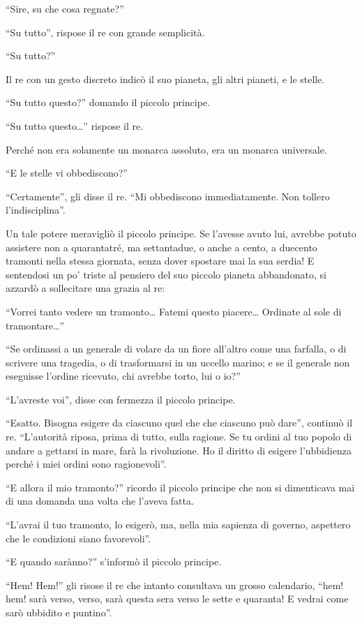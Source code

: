 \documentclass[11pt]{scrbook}
\begin{document}
``Sire, su che cosa regnate?''

``Su tutto'', rispose il re con grande semplicità.

``Su tutto?''

Il re con un gesto discreto indicò il suo pianeta, gli altri pianeti, e le stelle.

``Su tutto questo?'' domando il piccolo principe.

``Su tutto questo\ldots{}'' rispose il re.

Perché non era solamente un monarca assoluto, era un monarca universale.

``E le stelle vi obbediscono?''

``Certamente'', gli disse il re. ``Mi obbediscono immediatamente. Non tollero l'indisciplina''.

Un tale potere meravigliò il piccolo principe. Se l'avesse avuto lui, avrebbe potuto assistere non a quarantatré, ma settantadue, o anche a cento, a duecento tramonti nella stessa giornata, senza dover spostare mai la sua serdia! E sentendosi un po' triste al pensiero del suo piccolo pianeta abbandonato, si azzardò a sollecitare una grazia al re:

``Vorrei tanto vedere un tramonto\ldots{} Fatemi questo piacere\ldots{} Ordinate al sole di tramontare\ldots{}''

``Se ordinassi a un generale di volare da un fiore all'altro come una farfalla, o di scrivere una tragedia, o di trasformarsi in un uccello marino; e se il generale non eseguisse l'ordine ricevuto, chi avrebbe torto, lui o io?''

``L'avreste voi'', disse con fermezza il piccolo principe.

``Esatto. Bisogna esigere da ciascuno quel che che ciascuno può dare'', continuò il re. ``L'autorità riposa, prima di tutto, sulla ragione. Se tu ordini al tuo popolo di andare a gettarsi in mare, farà la rivoluzione. Ho il diritto di esigere l'ubbidienza perché i miei ordini sono ragionevoli''.

``E allora il mio tramonto?'' ricordo il piccolo principe che non si dimenticava mai di una domanda una volta che l'aveva fatta.

``L'avrai il tuo tramonto, lo esigerò, ma, nella mia sapienza di governo, aspettero che le condizioni siano favorevoli''.

``E quando sarànno?'' s'informò il piccolo principe.

``Hem! Hem!'' gli risose il re che intanto consultava un grosso calendario, ``hem! hem! sarà verso, verso, sarà questa sera verso le sette e quaranta! E vedrai come sarò ubbidito e puntino''.
\end{document}
